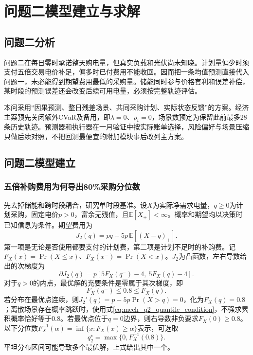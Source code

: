 \section{问题二模型建立与求解}

\subsection{问题二分析}

问题二在每日零时承诺整天购电量，但真实负载和光伏尚未知晓。计划量偏少时须支付五倍交易电价补足，偏多时已付费用不能收回。因而把一条均值预测直接代入问题一，未必能得到期望费用最低的采购量。储能同时参与价格套利和误差补偿，某时段的预测误差还会改变后续可用电量，必须按完整轨迹评估。

本问采用“因果预测、整日残差场景、共同采购计划、实际状态反馈”的方案\cite{abunima2022,marino2018,grover2018}。经济主案预先关闭额外CVaR及备用，即$\lambda=0$、$\rho_t=0$，场景数预定为保留此前最多28条历史轨迹。预测器和执行器在一月验证中按实际账单选择，风险偏好与场景压缩只做后续对照，不把回测最便宜的附加模块事后改列主方案。

\subsection{问题二模型建立}

\subsubsection{五倍补购费用为何导出80\%采购分位数}

先去掉储能和跨时段耦合，研究单时段基准。设$X$为实际净需求电量，$q\ge0$为计划采购，固定电价$p>0$，富余无残值，且$\mathbb E[X_+]<\infty$。概率和期望均以决策时已知信息为条件。期望费用为
\begin{equation}
 J_2(q)=pq+5p\,\mathbb E[(X-q)_+].
 \label{eq:mech_q2_cost}
\end{equation}
第一项是无论是否使用都要支付的计划费，第二项是计划不足时的补购费。记$F_X(x)=\Pr(X\le x)$、$F_X(x^-)=\Pr(X<x)$。$J_2$为凸函数，左右导数给出的次梯度为
\begin{equation}
 \partial J_2(q)=p[5F_X(q^-)-4,\ 5F_X(q)-4].
 \label{eq:mech_q2_subgradient}
\end{equation}
对于$q>0$的内点，最优解的充要条件是零属于其次梯度，即
\begin{equation}
 F_X(q^-)\le0.8\le F_X(q).
 \label{eq:mech_q2_quantile_condition}
\end{equation}
若分布在最优点连续，则$J_2'(q)=p-5p\Pr(X>q)=0$，化为$F_X(q)=0.8$；离散场景存在概率跳跃时，使用式\eqref{eq:mech_q2_quantile_condition}，不强求累积概率恰好等于0.8。若最优点位于$q=0$边界，则右导数非负要求$F_X(0)\ge0.8$。以下分位数$F_X^{-1}(\alpha)=\inf\{x:F_X(x)\ge\alpha\}$表示，可选取
\begin{equation}
 q_2^\star=\max\{0,F_X^{-1}(0.8)\}.
 \label{eq:mech_q2_quantile}
\end{equation}
平坦分布区间可能导致多个最优解，上式给出其中一个。

